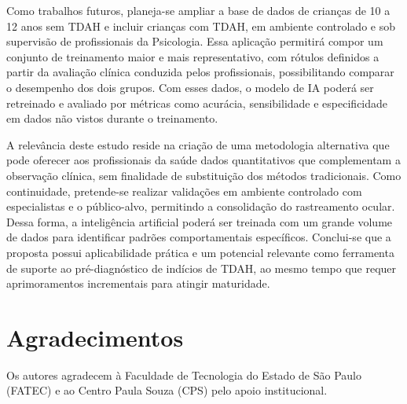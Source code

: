 \documentclass[11pt,a4paper]{article}
\begin{document}
Como trabalhos futuros, planeja-se ampliar a base de dados de crianças de 10 a 12 anos sem TDAH e incluir crianças com TDAH, em ambiente controlado e sob supervisão de profissionais da Psicologia. Essa aplicação permitirá compor um conjunto de treinamento maior e mais representativo, com rótulos definidos a partir da avaliação clínica conduzida pelos profissionais, possibilitando comparar o desempenho dos dois grupos. Com esses dados, o modelo de IA poderá ser retreinado e avaliado por métricas como acurácia, sensibilidade e especificidade em dados não vistos durante o treinamento.

A relevância deste estudo reside na criação de uma metodologia alternativa que pode oferecer aos profissionais da saúde dados quantitativos que complementam a observação clínica, sem finalidade de substituição dos métodos tradicionais. Como continuidade, pretende-se realizar validações em ambiente controlado com especialistas e o público-alvo, permitindo a consolidação do rastreamento ocular. Dessa forma, a inteligência artificial poderá ser treinada com um grande volume de dados para identificar padrões comportamentais específicos. Conclui-se que a proposta possui aplicabilidade prática e um potencial relevante como ferramenta de suporte ao pré-diagnóstico de indícios de TDAH, ao mesmo tempo que requer aprimoramentos incrementais para atingir maturidade.

\section*{Agradecimentos}

Os autores agradecem à Faculdade de Tecnologia do Estado de São Paulo (FATEC) e ao Centro Paula Souza (CPS) pelo apoio institucional. 



\end{document}
